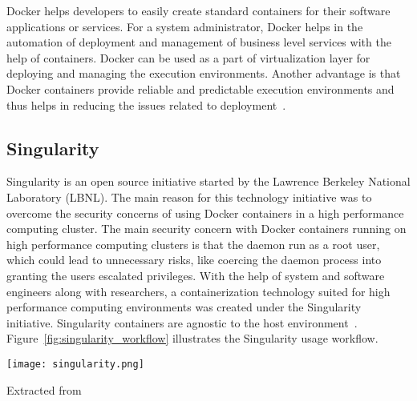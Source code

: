 Docker helps developers to easily create standard containers for their 
software applications or services. For a system administrator, Docker 
helps in the automation of deployment and management of business level 
services with the help of containers. Docker can be used as a part of 
virtualization layer for deploying and managing the execution 
environments. Another advantage is that Docker containers provide 
reliable and predictable execution environments and thus helps in 
reducing the issues related to 
deployment~\cite{DBLP:journals/corr/MorrisVHM17}.

\subsection{Singularity}
Singularity is an open source initiative started by the Lawrence 
Berkeley National Laboratory (LBNL). The main reason for this 
technology initiative was to overcome the security concerns of 
using Docker containers in a high performance computing cluster. The 
main security concern with Docker containers running on high performance 
computing clusters is that the daemon run as a root user, which 
could lead to unnecessary risks, like coercing the daemon process into 
granting the users escalated privileges. With the help of system and 
software engineers along with researchers, a containerization 
technology suited for high performance computing environments was created under the Singularity initiative. Singularity containers 
are agnostic to the host 
environment~\cite{10.1371/journal.pone.0177459}. 
Figure~\ref{fig:singularity_workflow} illustrates the Singularity usage 
workflow.

\begin{center}
\texttt{[image: singularity.png]}
\label{fig:singularity_workflow}
\caption*{Extracted from \cite{10.1371/journal.pone.0177459}}
\end{center}

